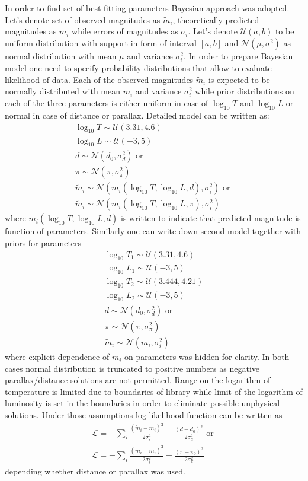 \documentclass{pracalicmgr}
\begin{document}
In order to find set of best fitting parameters Bayesian approach was adopted. Let's denote set of observed magnitudes as $\tilde{m}_i$, theoretically predicted
magnitudes as $m_i$ while errors of magnitudes as $\sigma_i$. Let's denote $\mathcal{U}(a,b)$ to be uniform distribution with support in form of interval $[a,b]$ and $\mathcal{N}(\mu,\sigma^2)$ as
normal distribution with mean $\mu$ and variance $\sigma_i^2$. In order to prepare Bayesian model one need to specify probability distributions that allow to evaluate likelihood of 
data. Each of the observed magnitudes $\tilde{m}_i$ is expected to be normally distributed with mean $m_i$ and variance $\sigma_i^2$ while prior distributions on each of the three parameters
is either uniform in case of $\log_{10} T$ and $\log_{10} L$ or normal in case of distance or parallax. Detailed model can be written as:
\begin{align}
    \log_{10}{T}\sim \mathcal{U}(3.31,4.6)\\
    \log_{10}{L} \sim \mathcal{U}(-3,5)\\
    d \sim \mathcal{N}(d_0,\sigma_d^2) \textrm{ or } \\
    \pi \sim \mathcal{N} (\pi,\sigma_{\pi}^2)\\
    \tilde{m}_i\sim \mathcal{N}(m_i(\log_{10} T, \log_{10} L, d ),\sigma_i^2) \textrm{ or }\\
    \tilde{m}_i\sim \mathcal{N}(m_i(\log_{10} T, \log_{10} L, \pi ),\sigma_i^2)
\end{align}
where  $m_i(\log_{10} T, \log_{10} L, d )$ is written to indicate that predicted magnitude is function of parameters. 
Similarly one can write down second model together with priors for parameters
\begin{align}
    \log_{10}{T_1}\sim \mathcal{U}(3.31,4.6)\\
    \log_{10}{L_1} \sim \mathcal{U}(-3,5)\\
    \log_{10}{T_2}\sim \mathcal{U}(3.444,4.21)\\
    \log_{10}{L_2} \sim \mathcal{U}(-3,5)\\
    d \sim \mathcal{N}(d_0,\sigma_d^2) \textrm{ or } \\
    \pi \sim \mathcal{N} (\pi,\sigma_{\pi}^2)\\
    \tilde{m}_i\sim \mathcal{N}(m_i,\sigma_i^2)
\end{align}
where explicit dependence of $m_i$ on parameters was hidden for clarity. In both cases normal distribution is truncated to positive numbers as 
negative parallax/distance solutions are not permitted. Range on the logarithm of temperature is limited due to boundaries of library while limit of the logarithm of luminosity is 
set in the boundaries in order to eliminate possible unphysical solutions.
Under those assumptions log-likelihood function can be written as 
\begin{align}
    \mathcal{L}=-\sum_i\frac{(\tilde{m}_i-m_i)^2}{2\sigma_i^2}-\frac{(d-d_0)^2}{2\sigma_d^2} \textrm{ or }\\
    \mathcal{L}=-\sum_i\frac{(\tilde{m}_i-m_i)^2}{2\sigma_i^2}-\frac{(\pi-\pi_0)^2}{2\sigma_{\pi}^2}
\end{align} depending whether distance or parallax was used. 
\end{document}
